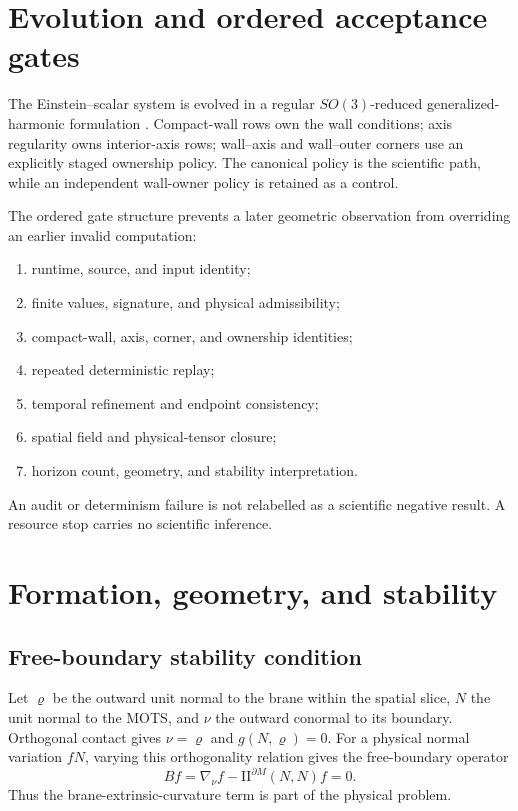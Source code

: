 \documentclass[11pt]{article}
\newcommand{\II}{\mathrm{II}}
\begin{document}
\section{Evolution and ordered acceptance gates}

The Einstein--scalar system is evolved in a regular $SO(3)$-reduced
generalized-harmonic formulation \cite{Pretorius2005}.  Compact-wall rows own the wall conditions;
axis regularity owns interior-axis rows; wall--axis and wall--outer corners use
an explicitly staged ownership policy.  The canonical policy is the scientific
path, while an independent wall-owner policy is retained as a control.

The ordered gate structure prevents a later geometric observation from
overriding an earlier invalid computation:
\begin{enumerate}
\item runtime, source, and input identity;
\item finite values, signature, and physical admissibility;
\item compact-wall, axis, corner, and ownership identities;
\item repeated deterministic replay;
\item temporal refinement and endpoint consistency;
\item spatial field and physical-tensor closure;
\item horizon count, geometry, and stability interpretation.
\end{enumerate}
An audit or determinism failure is not relabelled as a scientific negative
result.  A resource stop carries no scientific inference.

\section{Formation, geometry, and stability}

\subsection{Free-boundary stability condition}

Let $\varrho$ be the outward unit normal to the brane within the spatial
slice, $N$ the unit normal to the MOTS, and $\nu$ the outward conormal to its
boundary.  Orthogonal contact gives $\nu=\varrho$ and
$g(N,\varrho)=0$.  For a physical normal variation $fN$, varying this
orthogonality relation gives the free-boundary operator
\begin{equation}
Bf=\nabla_\nu f-\II^{\partial M}(N,N)f=0.
\end{equation}
Thus the brane-extrinsic-curvature term is part of the physical problem.
\end{document}
